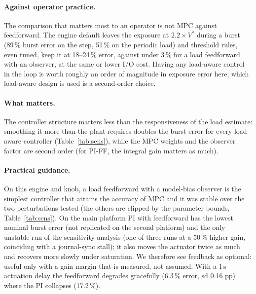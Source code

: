 \documentclass[smallextended]{svjour3}
\begin{document}
\paragraph{Against operator practice.}
The comparison that matters most to an operator is not MPC against feedforward. The engine default leaves the exposure at $2.2\times V^*$ during a burst (89\,\% burst error on the step, 51\,\% on the periodic load) and threshold rules, even tuned, keep it at 18--24\,\% error, against under 3\,\% for a load feedforward with an observer, at the same or lower I/O cost. Having any load-aware control in the loop is worth roughly an order of magnitude in exposure error here; which load-aware design is used is a second-order choice.
\paragraph{What matters.}
The controller structure matters less than the responsiveness of the load estimate: smoothing it more than the plant requires doubles the burst error for every load-aware controller (Table~\ref{tab:sens}), while the MPC weights and the observer factor are second order (for PI-FF, the integral gain matters as much).
\paragraph{Practical guidance.}
On this engine and knob, a load feedforward with a model-bias observer is the simplest controller that attains the accuracy of MPC and it was stable over the two perturbations tested (the others are clipped by the parameter bounds, Table~\ref{tab:sens}). On the main platform PI with feedforward has the lowest nominal burst error (not replicated on the second platform) and the only unstable run of the sensitivity analysis (one of three runs at a 50\,\% higher gain, coinciding with a journal-sync stall);
it also moves the actuator twice as much and recovers more slowly under saturation. We therefore see feedback as optional: useful only with a gain margin that is measured, not assumed. With a 1\,s actuation delay the feedforward degrades gracefully (6.3\,\% error, sd 0.16 pp) where the PI collapses (17.2\,\%).
\end{document}
